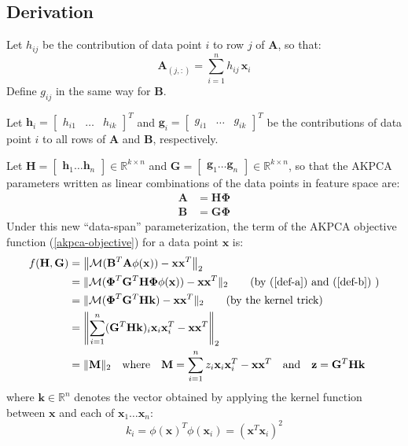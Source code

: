 \documentclass[]{article}
\newcommand{\reals}{\mathbb{R}}
\begin{document}
\subsection{Derivation}

Let $h_{ij}$ be the contribution of data point $i$ to row $j$ of $\mathbf{A}$, so that:
$$ \mathbf{A}_{(j,:)} = \sum_{i=1}^n h_{ij} \, \mathbf{x}_i  $$
Define $g_{ij}$ in the same way for $\mathbf{B}$.

Let $\mathbf{h}_i = \begin{bmatrix} h_{i1} & \hdots & h_{ik} \end{bmatrix}^T$ and $\mathbf{g}_i = \begin{bmatrix} g_{i1} & \hdots & g_{ik} \end{bmatrix}^T$ be the contributions of data point $i$ to all rows of $\mathbf{A}$ and $\mathbf{B}$, respectively.

Let $\mathbf{H} = \begin{bmatrix} \mathbf{h}_1 \hdots \mathbf{h}_n \end{bmatrix} \in \reals^{k \times n}$ and $\mathbf{G} = \begin{bmatrix} \mathbf{g}_1 \hdots \mathbf{g}_n \end{bmatrix} \in \reals^{k \times n}$, so that the AKPCA parameters written as linear combinations of the data points in feature space are:
\begin{align}
\label{def-a}
\mathbf{A} &= \mathbf{H} \boldsymbol{\Phi} \\
\label{def-b}
\mathbf{B} &= \mathbf{G} \boldsymbol{\Phi} 
\end{align}
Under this new ``data-span'' parameterization, the term of the AKPCA objective function (\ref{akpca-objective}) for a data point $\mathbf{x}$ is:
\begin{align}
f(\mathbf{H}, \mathbf{G}) &= \left \| \mathcal{M}(\mathbf{B}^T \mathbf{A} \phi(\mathbf{x})) - \mathbf{x} \mathbf{x}^T \right \|_2  \nonumber \\
&= \| \mathcal{M}(\boldsymbol{\Phi}^T \mathbf{G}^T \mathbf{H} \boldsymbol{\Phi} \phi(\mathbf{x})) - \mathbf{x} \mathbf{x}^T \|_2 \tag{by (\ref{def-a}) and (\ref{def-b}) } \nonumber \\
&= \| \mathcal{M}(\boldsymbol{\Phi}^T \mathbf{G}^T \mathbf{H} \mathbf{k}) - \mathbf{x} \mathbf{x}^T \|_2 \nonumber  \tag{by the kernel trick} \\
\label{ds-objective}
&= \left \| \sum_{i=1}^n (\mathbf{G}^T \mathbf{H} \mathbf{k})_i \mathbf{x}_i \mathbf{x}_i^T  - \mathbf{x} \mathbf{x}^T \right \|_2  \\
&= \| \mathbf{M} \|_2 \quad \text{where} \quad \mathbf{M} = \sum_{i=1}^n z_i \mathbf{x}_i \mathbf{x}_i^T  - \mathbf{x} \mathbf{x}^T \quad \text{and} \quad \mathbf{z} = \mathbf{G}^T \mathbf{H} \mathbf{k}\nonumber
\end{align}
where $\mathbf{k} \in \reals^n$ denotes the vector obtained by applying the kernel function between $\mathbf{x}$ and each of $\mathbf{x}_1 \hdots \mathbf{x}_n$:
$$k_i =  \phi(\mathbf{x})^T \phi(\mathbf{x}_i) = (\mathbf{x}^T \mathbf{x}_i)^2$$
\end{document}
